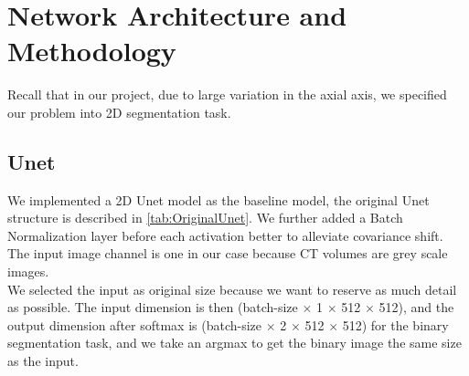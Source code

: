 \section{Network Architecture and Methodology}
Recall that in our project, due to large variation in the axial axis, we specified our problem into 2D segmentation task.\\

\subsection{Unet}
We implemented a 2D Unet model as the baseline model, the original Unet structure is described in \ref{tab:OriginalUnet}. We further added a Batch Normalization layer before each activation better to alleviate covariance shift. The input image channel is one in our case because CT volumes are grey scale images.\\
We selected the input as original size because we want to reserve as much detail as possible. 
The input dimension is then (batch-size $\times$ 1 $\times$ 512 $\times$ 512), and the output dimension after softmax is (batch-size $\times$ 2 $\times$ 512 $\times$ 512) for the binary segmentation task, and we take an argmax to get the binary image the same size as the input.\\

